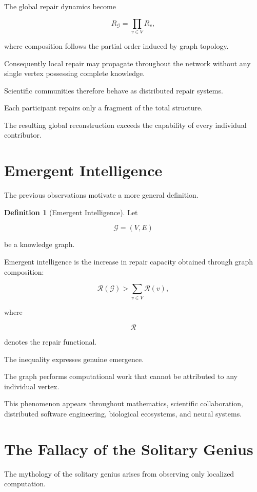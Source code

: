 \documentclass[11pt,oneside]{book}
\numberwithin{equation}{chapter}
\theoremstyle{definition}
\newtheorem{definition}{Definition}[chapter]
\theoremstyle{plain}
\begin{document}
The global repair dynamics become

\[
R_{\mathcal{G}}
=
\prod_{v\in V}
R_v,
\]

where composition follows the partial order induced by graph topology.

Consequently local repair may propagate throughout the network without any
single vertex possessing complete knowledge.

Scientific communities therefore behave as distributed repair systems.

Each participant repairs only a fragment of the total structure.

The resulting global reconstruction exceeds the capability of every
individual contributor.

\section{Emergent Intelligence}

The previous observations motivate a more general definition.

\begin{definition}[Emergent Intelligence]

Let

\[
\mathcal{G}
=
(V,E)
\]

be a knowledge graph.

Emergent intelligence is the increase in repair capacity obtained through
graph composition:

\[
\mathcal{R}(\mathcal{G})
>
\sum_{v\in V}
\mathcal{R}(v),
\]

where

\[
\mathcal{R}
\]

denotes the repair functional.

\end{definition}

The inequality expresses genuine emergence.

The graph performs computational work that cannot be attributed to any
individual vertex.

This phenomenon appears throughout mathematics, scientific collaboration,
distributed software engineering, biological ecosystems, and neural systems.

\section{The Fallacy of the Solitary Genius}

The mythology of the solitary genius arises from observing only localized
computation.
\end{document}
